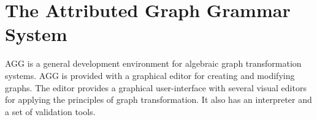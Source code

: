 \documentclass[pdftex,11pt,a4paper]{article}
\begin{document}
\section{The Attributed Graph Grammar System}

AGG is a general development environment for algebraic graph transformation
systems. AGG is provided with a graphical editor for creating and modifying
graphs. The editor provides a graphical user-interface with several visual
editors for applying the principles of graph transformation. It also has an
interpreter and a set of validation tools.

\subsection{}



\pagebreak
 

\end{document}
